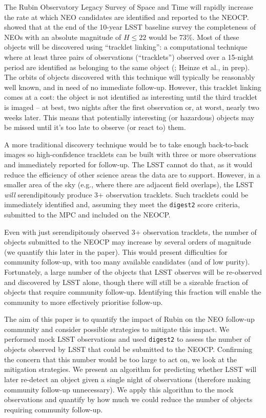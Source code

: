 \documentclass[twocolumn]{aastex631}
\newcommand{\dig}{\texttt{digest2}}
\begin{document}
The Rubin Observatory Legacy Survey of Space and Time \citep[LSST,][]{Ivezic+2019} will rapidly increase the rate at which NEO candidates are identified and reported to the NEOCP. \citet{Jones+2018} showed that at the end of the 10-year LSST baseline survey the completeness of NEOs with an absolute magnitude of $H \le 22$ would be 73\%. Most of these objects will be discovered using ``tracklet linking'': a computational technique where at least three pairs of observations (``tracklets'') observed over a 15-night period are identified as belonging to the same object (\citealp{Juric+2017}; Heinze et al., in prep). The orbits of objects discovered with this technique will typically be reasonably well known, and in need of no immediate follow-up. However, this tracklet linking comes at a cost: the object is not identified as interesting until the third tracklet is imaged -- at best, two nights after the first observation or, at worst, nearly two weeks later. This means that potentially interesting (or hazardous) objects may be missed until it's too late to observe (or react to) them.

A more traditional discovery technique would be to take enough back-to-back images so high-confidence tracklets can be built with three or more observations and immediately reported for follow-up. The LSST cannot do that, as it would reduce the efficiency of other science areas the data are to support. However, in a smaller area of the sky (e.g., where there are adjacent field overlaps), the LSST {\em will} serendipitously produce 3+ observation tracklets. Such tracklets could be immediately identified and, assuming they meet the \dig{} score criteria, submitted to the MPC and included on the NEOCP.

Even with just serendipitously observed 3+ observation tracklets, the number of objects submitted to the NEOCP may increase by several orders of magnitude (we quantify this later in the paper). This would present difficulties for community follow-up, with too many available candidates (and of low purity). Fortunately, a large number of the objects that LSST observes will be re-observed and discovered by LSST alone, though there will still be a sizeable fraction of objects that require community follow-up. Identifying this fraction will enable the community to more effectively prioritise follow-up.

The aim of this paper is to quantify the impact of Rubin on the NEO follow-up community and consider possible strategies to mitigate this impact. We performed mock LSST observations and used \dig{} to assess the number of objects observed by LSST that could be submitted to the NEOCP. Confirming the concern that this number would be too large to act on, we look at the mitigation strategies. We present an algorithm for predicting whether LSST will later re-detect an object given a single night of observations (therefore making community follow-up unnecessary). We apply this algorithm to the mock observations and quantify by how much we could reduce the number of objects requiring community follow-up.
\end{document}
